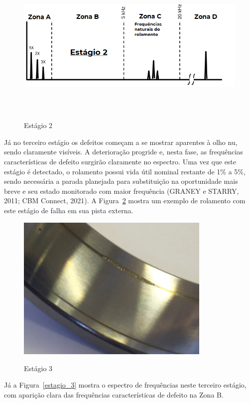 \documentclass[
	12pt,				
	oneside,			
	a4paper,			
	english,			
	brazil,			
	]{abntex2ppgsi}
\begin{document}
\begin{figure}[H]
\centering
\caption {Estágio 2}
\includegraphics[width=\textwidth,height=70mm,keepaspectratio]{estagio_2}
\label{estagio_2}
\end{figure}

Já no terceiro estágio os defeitos começam a se mostrar aparentes à olho nu, sendo claramente visíveis. A deterioração progride e, nesta fase, as frequências características de defeito surgirão claramente no espectro. Uma vez que este estágio é detectado, o rolamento possui vida útil nominal restante de 1\% a 5\%, sendo necessária a parada planejada para substituição na oportunidade mais breve e seu estado monitorado com maior frequência (GRANEY e STARRY, 2011; CBM Connect, 2021). A Figura~\ref{estagio_tres_pista_externa} mostra um exemplo de rolamento com este estágio de falha em sua pista externa.

\begin{figure}[H]
\centering
\caption {Estágio 3}
\includegraphics[width=\textwidth,height=70mm,keepaspectratio]{estagio_tres_pista_externa}
\label{estagio_tres_pista_externa}
\end{figure}

Já a Figura~\ref{estagio_3} mostra o espectro de frequências neste terceiro estágio, com aparição clara das frequências características de defeito na Zona B.
\end{document}
